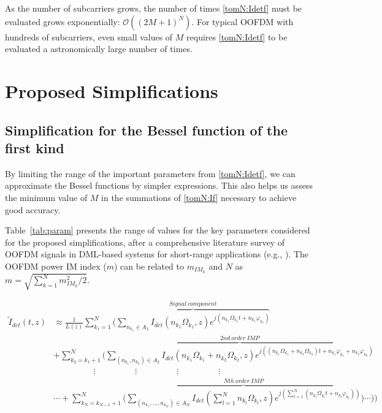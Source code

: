 \documentclass[journal]{IEEEtran}
\begin{document}
As the number of subcarriers grows, the number of times \eqref{tomN:Idetf} must be evaluated grows exponentially: $\mathcal{O}((2M + 1)^N)$. For typical OOFDM with hundreds of subcarriers, even small values of $M$ requires \eqref{tomN:Idetf} to be evaluated a astronomically large number of times.
\section{Proposed Simplifications} \label{sec:simpl}
\subsection{Simplification for the Bessel function of the first kind} \label{sec:simpl1}
By limiting the range of the important parameters from \eqref{tomN:Idetf}, we can approximate the Bessel functions by simpler expressions. This also helps us assess the minimum value of $M$ in the summations of \eqref{tomN:If} necessary to achieve good accuracy.

Table~\ref{tab:param} presents the range of values for the key parameters considered for the proposed simplifications, after a comprehensive literature survey of OOFDM signals in DML-based systems for short-range applications (e.g., \cite{OFDM-GbE-UWB, equalization, evaOFDM}). The OOFDM power IM index ($m$) can be related to $m_{IM_k}$ and $N$ as $m = \sqrt{\sum_{k=1}^N m_{IM_k}^2/2}$. 
\setcounter{equation}{2}
\begin{table*}[bp]
\hline
\begin{align} \label{tomN:Is2} \nonumber
\tilde{I}_{det}(t,z) & \approx \frac{1}{L(z)}\sum_{k_1=1}^N\Bigg(\overbrace{\sum_{n_{k_1} \in A_1} I_{det}(n_{k_1}\Omega_{k_1},z)e^{j(n_{k_1}\Omega_{k_1}t + n_{k_1}\varphi_{k_1})}}^{Signal~component}\\ \nonumber
& + \sum_{k_2=k_1+1}^{N}\Bigg(\overbrace{\sum_{(n_{k_1}, n_{k_2}) \in A_2} I_{det}(n_{k_1}\Omega_{k_1}+n_{k_2}\Omega_{k_2},z)e^{j((n_{k_1}\Omega_{k_1}+n_{k_2}\Omega_{k_2})t + n_{k_1}\varphi_{k_1}+n_{k_2}\varphi_{k_2})}}^{2nd~order~IMP} \\ \nonumber
& ~~~~~~~~~~~~~~~~~~~~~\vdots~~~~~~~~~~~~~~~~~~~~~\vdots~~~~~~~~~~~~~~~~~~~~~\vdots~~~~~~~~~~~~~~~~~~~~~\vdots\\
& \cdots + \sum_{k_N=k_{N-1}+1}^{N}\Bigg(\overbrace{\sum_{(n_{k_1}, \ldots, n_{k_N}) \in A_N} I_{det}(\textstyle\sum_{l=1}^N n_{k_l}
\Omega_{k_l},z)e^{j(\sum_{l=1}^N (n_{k_l}\Omega_{k_l}t + n_{k_l}\varphi_{k_l}))}}^{Nth~order~IMP}\Bigg)\cdots\Bigg)\Bigg)
\end{align}
\end{table*}
\end{document}
